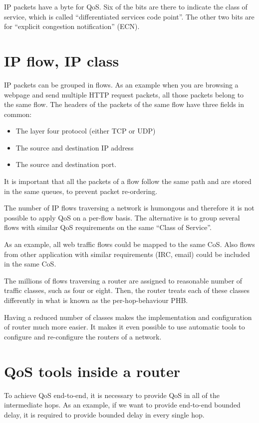 IP packets have a byte for QoS.
Six of the bits are there to indicate the class of service, which is called ``differentiated services code point''.
The other two bits are for ``explicit congestion notification'' (ECN).

\section{IP flow, IP class}

IP packets can be grouped in flows.
As an example when you are browsing a webpage and send multiple HTTP request packets, all those packets belong to the same flow.
The headers of the packets of the same flow have three fields in common:

\begin{itemize}
\item The layer four protocol (either TCP or UDP)
\item The source and destination IP address
\item The source and destination port.
\end{itemize}

It is important that all the packets of a flow follow the same path and are stored in the same queues, to prevent packet re-ordering.

The number of IP flows traversing a network is humongous and therefore it is not possible to apply QoS on a per-flow basis.
The alternative is to group several flows with similar QoS requirements on the same ``Class of Service''.

As an example, all web traffic flows could be mapped to the same CoS.
Also flows from other application with similar requirements (IRC, email) could be included in the same CoS.

The millions of flows traversing a router are assigned to reasonable number of traffic classes, such as four or eight.
Then, the router treats each of these classes differently in what is known as the per-hop-behaviour PHB.

Having a reduced number of classes makes the implementation and configuration of router much more easier.
It makes it even possible to use automatic tools to configure and re-configure the routers of a network.

\section{QoS tools inside a router}

To achieve QoS end-to-end, it is necessary to provide QoS in all of the intermediate hops.
As an example, if we want to provide end-to-end bounded delay, it is required to provide  bounded delay in every single hop.

